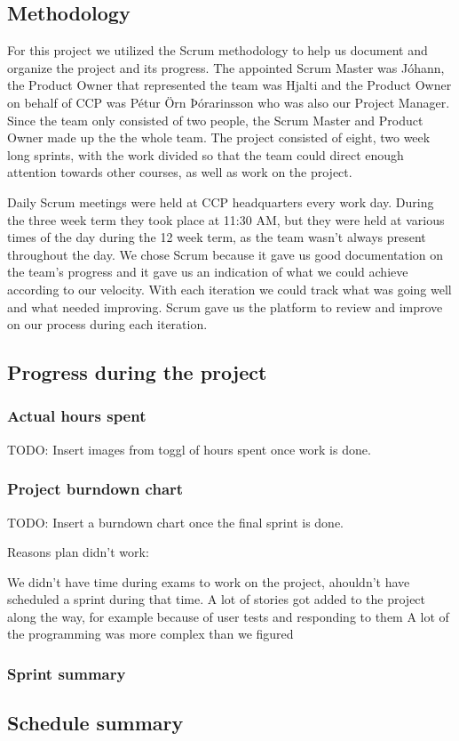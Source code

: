 \subsection{Methodology}
For this project we utilized the Scrum methodology to help us document and organize the project and its progress. The appointed Scrum Master was Jóhann, the Product Owner that represented the team was Hjalti and the Product Owner on behalf of CCP was Pétur Örn Þórarinsson who was also our Project Manager. Since the team only consisted of two people, the Scrum Master and Product Owner made up the the whole team. The project consisted of eight, two week long sprints, with the work divided so that the team could direct enough attention towards other courses, as well as work on the project.

Daily Scrum meetings were held at CCP headquarters every work day. During the three week term they took place at 11:30 AM, but they were held at various times of the day during the 12 week term, as the team wasn't always present throughout the day. We chose Scrum because it gave us good documentation on the team's progress and it gave us an indication of what we could achieve according to our velocity. With each iteration we could track what was going well and what needed improving. Scrum gave us the platform to review and improve on our process during each iteration.

\subsection{Progress during the project}

\subsubsection{Actual hours spent}

TODO: Insert images from toggl of hours spent once work is done.

\subsubsection{Project burndown chart}

TODO: Insert a burndown chart once the final sprint is done.

Reasons plan didn't work:

We didn't have time during exams to work on the project, ahouldn't have scheduled a sprint during that time.
A lot of stories got added to the project along the way, for example because of user tests and responding to them
A lot of the programming was more complex than we figured 

\subsubsection{Sprint summary}

\subsection{Schedule summary}